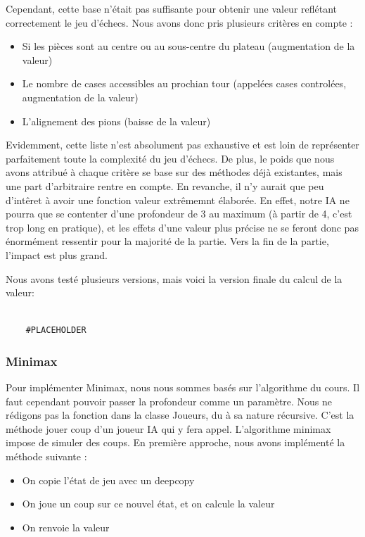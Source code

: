 \documentclass{article}
\begin{document}
Cependant, cette base n'était pas suffisante pour obtenir une valeur reflétant correctement le jeu d'échecs.
Nous avons donc pris plusieurs critères en compte :
\begin{itemize}
    \item Si les pièces sont au centre ou au sous-centre du plateau (augmentation de la valeur)
    \item Le nombre de cases accessibles au prochian tour (appelées cases controlées, augmentation de la valeur)
    \item L'alignement des pions (baisse de la valeur)
\end{itemize}

Evidemment, cette liste n'est absolument pas exhaustive et est loin de représenter parfaitement 
toute la complexité du jeu d'échecs. De plus, le poids que nous avons attribué à chaque critère se base
sur des méthodes déjà existantes, mais une part d'arbitraire rentre en compte. 
En revanche, il n'y aurait que peu d'intêret à avoir une fonction valeur extrêmemnt élaborée.
En effet, notre IA ne pourra que se contenter d'une profondeur de 3 au maximum (à partir de 4, c'est trop long en pratique),
et les effets d'une valeur plus précise ne se feront donc pas énormément ressentir pour la majorité de la partie.
Vers la fin de la partie, l'impact est plus grand.


Nous avons testé plusieurs versions, mais voici la version finale du calcul de la valeur:  
\begin{verbatim}

    #PLACEHOLDER
\end{verbatim}

\subsubsection{Minimax}
Pour implémenter Minimax, nous nous sommes basés sur l'algorithme du cours.
Il faut cependant pouvoir passer la profondeur comme un paramètre.
Nous ne rédigons pas la fonction dans la classe Joueurs, du à sa nature récursive.
C'est la méthode jouer coup d'un joueur IA qui y fera appel.
L'algorithme minimax impose de simuler des coups.
En première approche, nous avons implémenté la méthode suivante : \\
\begin{itemize}
    \item On copie l'état de jeu avec un deepcopy 
    \item On joue un coup sur ce nouvel état, et on calcule la valeur
    \item On renvoie la valeur
\end{itemize}
\end{document}
